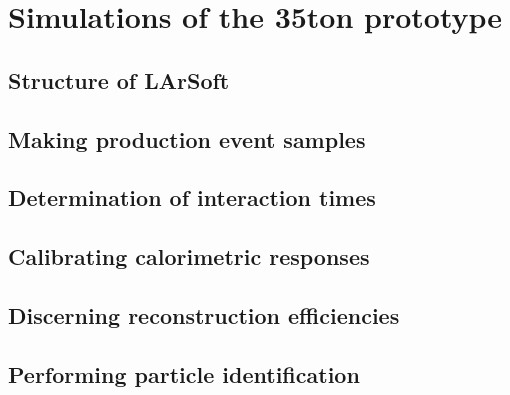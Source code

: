 
\chapter{Simulations of the 35ton prototype}  %

\ifpdf
    \graphicspath{{35tonSimulation/Figs/Raster/}{35tonSimulation/Figs/PDF/}{35tonSimulation/Figs/}}
\else
    \graphicspath{{35tonSimulation/Figs/Vector/}{35tonSimulation/Figs/}}
\fi

\section{Structure of LArSoft} %

\section{Making production event samples} %

\section{Determination of interaction times} %

\section{Calibrating calorimetric responses}  %

\section{Discerning reconstruction efficiencies}  %

\section{Performing particle identification}  %


